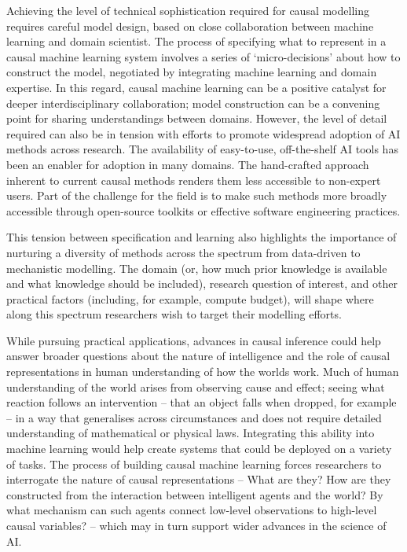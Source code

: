Achieving the level of technical sophistication required for causal
modelling requires careful model design, based on close collaboration
between machine learning and domain scientist. The process of specifying
what to represent in a causal machine learning system involves a series
of `micro-decisions' about how to construct the model, negotiated by
integrating machine learning and domain expertise. In this regard,
causal machine learning can be a positive catalyst for deeper
interdisciplinary collaboration; model construction can be a convening
point for sharing understandings between domains. However, the level of
detail required can also be in tension with efforts to promote
widespread adoption of AI methods across research. The availability of
easy-to-use, off-the-shelf AI tools has been an enabler for adoption in
many domains. The hand-crafted approach inherent to current causal
methods renders them less accessible to non-expert users. Part of the
challenge for the field is to make such methods more broadly accessible
through open-source toolkits or effective software engineering
practices.

This tension between specification and learning also highlights the
importance of nurturing a diversity of methods across the spectrum from
data-driven to mechanistic modelling. The domain (or, how much prior
knowledge is available and what knowledge should be included), research
question of interest, and other practical factors (including, for
example, compute budget), will shape where along this spectrum
researchers wish to target their modelling efforts.

While pursuing practical applications, advances in causal inference
could help answer broader questions about the nature of intelligence and
the role of causal representations in human understanding of how the
worlds work. Much of human understanding of the world arises from
observing cause and effect; seeing what reaction follows an intervention
-- that an object falls when dropped, for example -- in a way that
generalises across circumstances and does not require detailed
understanding of mathematical or physical laws. Integrating this ability
into machine learning would help create systems that could be deployed
on a variety of tasks. The process of building causal machine learning
forces researchers to interrogate the nature of causal representations
-- What are they? How are they constructed from the interaction between
intelligent agents and the world? By what mechanism can such agents
connect low-level observations to high-level causal variables? -- which
may in turn support wider advances in the science of AI.

